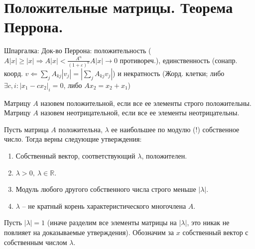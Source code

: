 \section{
 Положительные матрицы. Теорема Перрона.
}

Шпаргалка: Док-во Перрона: положительность ($ A|x| \ge |x| \Rightarrow A|x| < \frac{A^n}{(1+\varepsilon)^n}A|x| \to 0$ противореч.), единственность (сонапр. коорд. $v \Leftarrow \sum\limits_{j} A_{kj} |v_j| = |\sum\limits_{j} A_{kj} v_j| $) и некратность (Жорд. клетки; либо $\exists c, i: |x_1 - c x_2|_i = 0$, либо $ A x_2 = x_2 + x_1 $)

 Матрицу $ A $ назовем положительной, если все ее элементы строго положительны.
 Матрицу $ A $ назовем неотрицательной, если все ее элементы неотрицательны.

\thrm[Перрона]
  Пусть матрица $ A $ положительна, $ \lambda $ ее наибольшее по модулю (!) собственное число. Тогда верны следующие утверждения:
  \begin{enumerate}
    \item Собственный вектор, соответствующий $ \lambda $, положителен.
    \item $ \lambda > 0,\ \lambda \in \mathbb{R} $.
    \item Модуль любого другого собственного числа строго меньше $ |\lambda| $.  
    \item $ \lambda $ -- не кратный корень характеристического многочлена $ A $.
  \end{enumerate}
\ethrm
\proof
  Пусть $ |\lambda| = 1 $ (иначе разделим все элементы матрицы на $ |\lambda| $, это никак не повлияет на доказываемые утверждения). Обозначим за $ x $ собственный вектор с собственным числом $ \lambda $.
